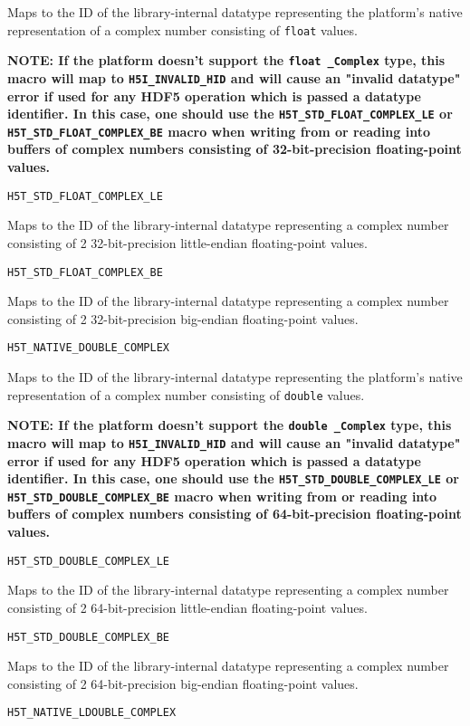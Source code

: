 \documentclass[../HDF5_RFC.tex]{subfiles}
\begin{document}
Maps to the ID of the library-internal datatype representing the platform's native representation
of a complex number consisting of \texttt{float} values.

\textbf{NOTE: If the platform doesn't support the \texttt{float \_Complex} type, this macro will map to
\texttt{H5I\_INVALID\_HID} and will cause an "invalid datatype" error if used for any HDF5 operation
which is passed a datatype identifier. In this case, one should use the \texttt{H5T\_STD\_FLOAT\_COMPLEX\_LE}
or \texttt{H5T\_STD\_FLOAT\_COMPLEX\_BE} macro when writing from or reading into buffers of complex numbers
consisting of 32-bit-precision floating-point values.}

\texttt{H5T\_STD\_FLOAT\_COMPLEX\_LE}

Maps to the ID of the library-internal datatype representing a complex number consisting of 2
32-bit-precision little-endian floating-point values.

\texttt{H5T\_STD\_FLOAT\_COMPLEX\_BE}

Maps to the ID of the library-internal datatype representing a complex number consisting of 2
32-bit-precision big-endian floating-point values.

\texttt{H5T\_NATIVE\_DOUBLE\_COMPLEX}

Maps to the ID of the library-internal datatype representing the platform's native representation
of a complex number consisting of \texttt{double} values.

\textbf{NOTE: If the platform doesn't support the \texttt{double \_Complex} type, this macro will map to
\texttt{H5I\_INVALID\_HID} and will cause an "invalid datatype" error if used for any HDF5 operation
which is passed a datatype identifier. In this case, one should use the \texttt{H5T\_STD\_DOUBLE\_COMPLEX\_LE}
or \texttt{H5T\_STD\_DOUBLE\_COMPLEX\_BE} macro when writing from or reading into buffers of complex numbers
consisting of 64-bit-precision floating-point values.}

\texttt{H5T\_STD\_DOUBLE\_COMPLEX\_LE}

Maps to the ID of the library-internal datatype representing a complex number consisting of 2
64-bit-precision little-endian floating-point values.

\texttt{H5T\_STD\_DOUBLE\_COMPLEX\_BE}

Maps to the ID of the library-internal datatype representing a complex number consisting of 2
64-bit-precision big-endian floating-point values.

\texttt{H5T\_NATIVE\_LDOUBLE\_COMPLEX}
\end{document}
